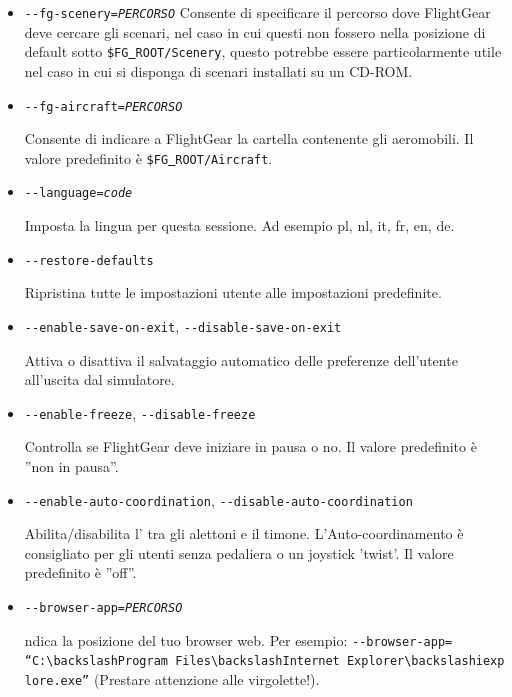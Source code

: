 \begin{itemize}
{\begin{itemize}
    Indica la cartella d'installazione di FlightGear.

  \item{\texttt{-$ $-fg-scenery={\it PERCORSO}}}
    Consente di specificare il percorso dove FlightGear deve cercare gli
    scenari, nel caso in cui questi non fossero nella posizione di default
    sotto \texttt{\$FG\underline{~}ROOT/Scenery}, questo potrebbe essere
    particolarmente utile nel caso in cui si disponga di scenari installati
    su un CD-ROM.

  \item{\texttt{-$ $-fg-aircraft={\it PERCORSO}}}

    Consente di indicare a FlightGear la cartella contenente gli aeromobili.
    Il valore predefinito \`{e}
    \texttt{\$FG\underline{~}ROOT/Aircraft}.

  \item{\texttt{-$ $-language={\it code}}}

    Imposta la lingua per questa sessione. Ad esempio pl, nl, it, fr, en, de.

  \item{\texttt{-$ $-restore-defaults}}

    Ripristina tutte le impostazioni utente alle impostazioni predefinite.

  \item{\texttt{-$ $-enable-save-on-exit}, \texttt{-$ $-disable-save-on-exit}}

    Attiva o disattiva il salvataggio automatico delle preferenze
    dell'utente all'uscita dal simulatore.

  \item{\texttt{-$ $-enable-freeze}, \texttt{-$ $-disable-freeze}}

    Controlla se FlightGear deve iniziare in pausa o no. Il valore
    predefinito \`{e} ''non in pausa''.

  \item{\texttt{-$ $-enable-auto-coordination}, \texttt{-$ $-disable-auto-coordination}}

    Abilita/disabilita l' tra gli alettoni e il timone.
    L'Auto-coordinamento \`{e} consigliato per gli utenti senza pedaliera
    o un joystick 'twist'. Il valore predefinito \`{e} ''off''.

  \item{\texttt{-$ $-browser-app={\it PERCORSO}}}

    ndica la posizione del tuo browser web. Per esempio:
    \texttt{-$ $-browser-app=}\\
    \texttt{``C:$\backslash$Program~Files$\backslash$Internet~Explorer$\backslash$iexplore.exe''}
    (Prestare attenzione alle virgolette!).


\end{itemize}}
\end{itemize}
